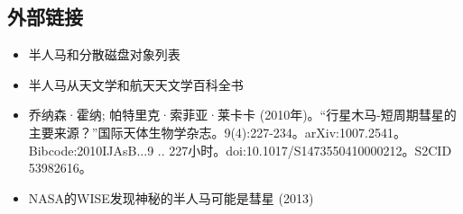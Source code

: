 \subsection{外部链接}
\begin{itemize}
\item 半人马和分散磁盘对象列表
\item 半人马从天文学和航天天文学百科全书
\item 乔纳森·霍纳; 帕特里克·索菲亚·莱卡卡 (2010年)。“行星木马-短周期彗星的主要来源？”国际天体生物学杂志。9(4):227-234。arXiv:1007.2541。Bibcode:2010IJAsB...9 .. 227小时。doi:10.1017/S1473550410000212。S2CID 53982616。
\item NASA的WISE发现神秘的半人马可能是彗星 (2013)
\end{itemize}